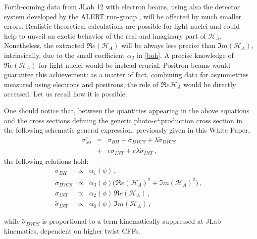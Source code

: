 \documentclass[times, twoside]{PosWhiPap}
\begin{document}
Forth-coming data from JLab 12 with electron beams, using also the detector system
developed by the ALERT run-group \cite{Armstrong:2017wfw}, will be affected by much smaller 
errors. Realistic theoretical calculations are possible for light nuclei and could help 
to unveil an exotic behavior of the real and imaginary part of $\mathcal{H}_{A}$.
Nonetheless, the extracted $\Re e(\mathcal{H}_{A})$ will be always less precise than
$\Im m(\mathcal{H}_{A})$, intrinsically, due to the small coefficient $\alpha_2$
in \eqref{boh}.
A precise knowledge of $\Re e(\mathcal{H}_{A})$ for light nuclei would be instead crucial.
Positron beams would guarantee this achievement: as a matter of fact, combining data for asymmetries measured 
using electrons and positrons, the role of $\Re e \mathcal{H}_{A}$ would be 
directly accessed. Let us recall how it is possible.

One should notice that, between the quantities appearing in the above
equations and the cross sections defining the generic photo-$e^\pm$production 
cross section in the following schematic general expression, previously given 
in this White Paper,
\begin{eqnarray}
\sigma^e_{\lambda 0}  & = & \sigma_{BH} + \sigma_{DVCS} + \lambda \tilde \sigma_{DVCS} 
\nonumber
\\
& + & e\sigma_{INT} + e \lambda \tilde \sigma_{INT} \, ,
\label{gen}
\end{eqnarray}
the following relations hold:
\begin{eqnarray}
\sigma_{BH} & \propto & \alpha_1(\phi)\, ,
\nonumber \\
\sigma_{DVCS} & \propto &   \alpha_{3}(\phi) 
\big( \Re e(\mathcal{H}_{A})^{2} + \Im m(\mathcal{H}_{A})^{2} \big) \, ,
\nonumber \\
\sigma_{INT} & \propto & \alpha_{2}(\phi) \, \Re e(\mathcal{H}_{A}) \, ,
\nonumber \\
\tilde \sigma_{INT} & \propto & \alpha_{0}(\phi) \, \Im m(\mathcal{H}_{A}) \, ,
\end{eqnarray}

while $\tilde \sigma_{DVCS} $ is proportional to a term kinematically suppressed
at JLab kinematics, dependent on higher twist CFFs. 
\end{document}
